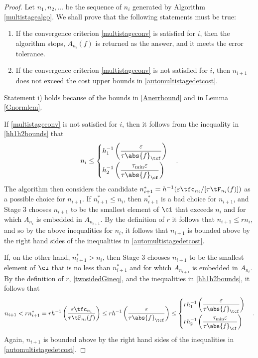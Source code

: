 \documentclass[]{elsarticle}
\theoremstyle{definition}
\theoremstyle{remark}
\newcommand{\Fnorm}[1]{\abs{#1}_{\cf}}
\newcommand{\Ftnorm}[1]{\abs{#1}_{\tcf}}
\begin{document}
\begin{proof} Let $n_1, n_2, \ldots$ be the sequence of $n_i$ generated by Algorithm \ref{multistagealgo}.  We shall prove that the following statements must be true:
\begin{enumerate}
\renewcommand{\labelenumi}{\roman{enumi})}
\item If the convergence criterion \eqref{multistageconv} is satisfied for $i$, then the algorithm stops, $A_{n_i}(f)$ is returned as the answer, and it meets the error tolerance.

\item If the convergence criterion \eqref{multistageconv} is not satisfied for $i$, then $n_{i+1}$ does not exceed the cost upper bounds in \eqref{automultistagedetcost}.

\end{enumerate}
Statement i) holds because of the bounds in \eqref{Anerrbound} and in Lemma \ref{Gnormlem}.

If \eqref{multistageconv} is not satisfied for $i$, then it follows from  the inequality in \eqref{hh1h2bounds} that 
\[
n_{i} \le 
\begin{cases} 
\displaystyle h_1^{-1}\left(\frac{\varepsilon}{\tau\Ftnorm{f}}\right) \\[2ex]
\displaystyle h_2^{-1}\left(\frac{\tau_{\min}\varepsilon}{\tau\Fnorm{f}}\right)
\end{cases} .
\] 
The algorithm then considers the candidate $n^*_{i+1} = h^{-1}(\varepsilon \tfc_{n_{i}}/[\tau \tF_{n_{i}}(f)])$ as a possible choice for $n_{i+1}$.  If $n^*_{i+1} \le n_{i}$, then $n^*_{i+1}$ is a bad choice for $n_{i+1}$, and Stage 3 chooses $n_{i+1}$ to be the smallest element of $\ci$ that exceeds $n_{i}$ and for which $A_{n_{i}}$ is embedded in $A_{n_{i+1}}$.  By the definition of $r$ it follows that $n_{i+1} \le r  n_{i}$, and so by the above inequalities for $n_{i}$, it follows that $n_{i+1}$ is bounded above by the right hand sides of the inequalities in \eqref{automultistagedetcost}.

If, on the other hand, $n^*_{i+1} > n_{i}$, then Stage 3 chooses $n_{i+1}$ to be the smallest element of $\ci$ that is no less than $n^*_{i+1}$ and for which $A_{n_{i+1}}$ is embedded in $A_{n_i}$.  By the definition of $r$, \eqref{twosidedGineq}, and the inequalities in \eqref{hh1h2bounds}, it follows that
\begin{equation*}
n_{i+1} < r n^*_{i+1} = r h^{-1}\left(\frac{\varepsilon \tfc_{n_{i}}}{\tau \tF_{n_{i}}(f)}\right) \le r  h^{-1}\left(\frac{\varepsilon}{\tau \Ftnorm{f}}\right) \le
\begin{cases}
\displaystyle  rh_1^{-1}\left(\frac{\varepsilon}{\tau \Ftnorm{f}} \right) \\[2ex]
\displaystyle rh_2^{-1}\left(\frac{\tau_{\min}\varepsilon}{\tau \Fnorm{f}} \right)
\end{cases}.
\end{equation*}
Again, $n_{i+1}$ is bounded above by the right hand sides of the inequalities in \eqref{automultistagedetcost}.


\end{proof}
\end{document}
